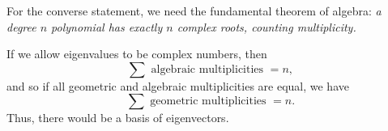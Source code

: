 \begin{parts}
\begin{solution}
				For the converse statement, we need the fundamental theorem of algebra:\emph{
					a degree $n$ polynomial has exactly $n$ complex roots, counting multiplicity.}

				If we allow eigenvalues to be complex numbers, then
				\[
					\sum \text{ algebraic multiplicities }= n,
				\]
				and so if all geometric and algebraic multiplicities are equal, we have
				\[
					\sum \text{ geometric multiplicities } = n.
				\]
				Thus, there would be a basis of eigenvectors.
			\end{solution}
	\end{parts}




